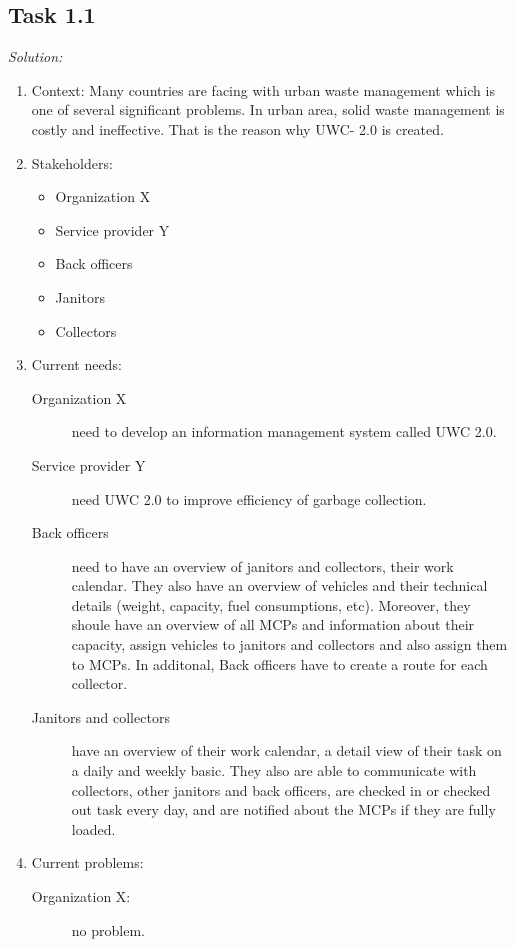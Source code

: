 \documentclass[a4paper]{article}
\begin{document}
\subsection{Task 1.1} 
\textit{Solution:} 
\begin{enumerate}
    \item Context: Many countries are facing with urban waste management which is one of several significant problems. In urban area, solid waste management is costly and ineffective. That is the reason why UWC- 2.0 is created.
    \item Stakeholders:
        \begin{itemize}
             \item Organization X
             \item Service provider Y
             \item Back officers
             \item Janitors
             \item Collectors
        \end{itemize}
    \item Current needs:
        \begin{description}
            \item[Organization X] need to develop an information management system called UWC 2.0.
            \item[Service provider Y] need UWC 2.0 to improve efficiency of garbage collection.
            \item[Back officers] need to have an overview of  janitors and collectors, their work calendar. They also have an overview of vehicles and their technical details (weight, capacity, fuel consumptions, etc). Moreover, they shoule have an overview of all MCPs and information about their capacity, assign vehicles to janitors and collectors and also assign them to MCPs. In additonal, Back officers have to create a route for each collector.
            \item[Janitors and collectors] have an overview of their work calendar, a detail view of their task on a daily and weekly basic. They also are able to communicate with collectors, other janitors and back officers, are checked in or checked out task every day, and are notified about the MCPs if they are fully loaded.
        \end{description}
    \item Current problems:
        \begin{description}
            \item[Organization X:] no problem.

\end{description}
\end{enumerate}
\end{document}
